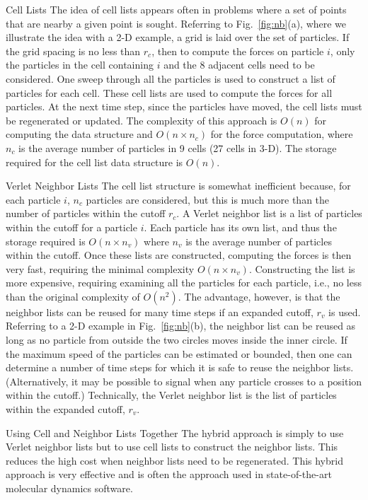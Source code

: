  {Cell Lists}  
The idea of cell lists appears often in problems where a
set of points that are nearby a given point is sought.  Referring to
Fig.~\ref{fig:nb}(a), where we illustrate the idea with a 2-D example, a grid is laid
over the set of particles.  If the grid spacing is no less than $r_c$,
then to compute the forces on particle $i$, only the particles in the
cell containing $i$ and the 8 adjacent cells need to be considered.
One sweep through all the particles is used to construct a list of
particles for each cell.  These cell lists are used to compute the forces
for all particles.  At the next time step, since the particles have moved,
the cell lists must be regenerated or updated.  The complexity of this
approach is $O(n)$ for computing the data structure and $O(n \times n_c)$
for the force computation, where $n_c$ is the average number of particles
in 9 cells (27 cells in 3-D).  The storage required for the cell list
data structure is $O(n)$.

 {Verlet Neighbor Lists}  
The cell list structure is somewhat
inefficient because, for each particle $i$, $n_c$ particles are
considered, but this is much more than the number of particles within
the cutoff $r_c$.  A Verlet neighbor list is a list of particles within
the cutoff for a particle $i$.  Each particle has its own list, and thus
the storage required is $O(n \times n_v)$ where $n_v$ is the average
number of particles within the cutoff.  Once these lists are constructed,
computing the forces is then very fast, requiring the minimal complexity
$O(n \times n_v)$.  Constructing the list is more expensive, requiring
examining all the particles for each particle, i.e., no less than the
original complexity of $O(n^2)$.  The advantage, however, is that the
neighbor lists can be reused for many time steps if an expanded cutoff,
$r_v$ is used.  Referring to a 2-D example in Fig.~\ref{fig:nb}(b),
the neighbor list can be reused as long as no particle from outside
the two circles moves inside the inner circle.  If the maximum speed
of the particles can be estimated or bounded, then one can determine a
number of time steps for which it is safe to reuse the neighbor lists.
(Alternatively, it may be possible to signal when any particle crosses
to a position within the cutoff.)  Technically, the Verlet neighbor list
is the list of particles within the expanded cutoff, $r_v$.

 {Using Cell and Neighbor Lists Together}  
The hybrid approach is simply to use Verlet neighbor
lists but to use cell lists to construct the neighbor lists.  This reduces
the high cost when neighbor lists need to be regenerated.  This hybrid approach
is very effective and is often the approach used in state-of-the-art 
molecular dynamics software.


